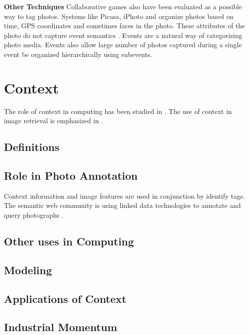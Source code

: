 \textbf{Other Techniques}
Collaborative games also have been evaluated as a possible way to tag photos\cite{diakopoulos2007photoplay}. Systems like Picasa, iPhoto and \cite{graham2002time} organize photos based on time, GPS coordinates and sometimes faces in the photo. These attributes of the photo do not capture event semantics \cite{sawant2011automatic}. Events are a natural way of categorizing photo media. Events also allow large number of photos captured during a single event be organized hierarchically using subevents.

\section{Context}

The role of context in computing has been studied in \cite{chen2000survey}. The use of context in image retrieval is emphasized in \cite{jain2010content, datta2008image}. 

\subsection{Definitions}

\subsection{Role in Photo Annotation}
Context information and image features are used in conjunction by \cite{o2009context, cao2008annotating, boutell2005beyond, cao2008eventscene} identify tags. The semantic web community is using linked data technologies to annotate and query photographs \cite{monaghan2006automating, nowack2006confoto}. 


\subsection{Other uses in Computing}

\subsection{Modeling}

\subsection{Applications of Context}

\subsection{Industrial Momentum}

